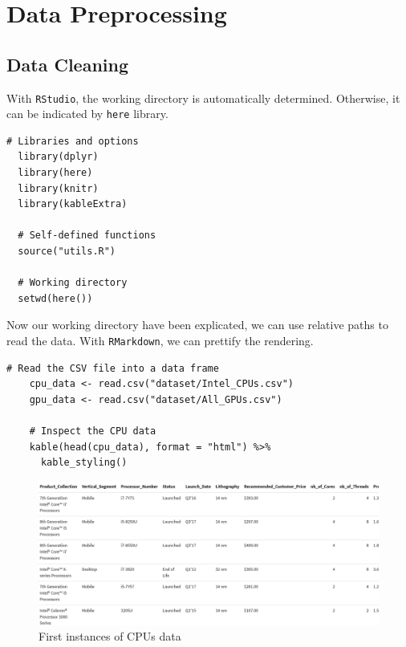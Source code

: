\chapter{Data Preprocessing}

\section{Data Cleaning}

With \texttt{RStudio}, the working directory is automatically determined. Otherwise, it can be indicated by \texttt{here} library.

\begin{lstlisting}[caption={Required libraries and working directory setup}]
  # Libraries and options
  library(dplyr)
  library(here)
  library(knitr)
  library(kableExtra)
  
  # Self-defined functions
  source("utils.R")
  
  # Working directory
  setwd(here())
  \end{lstlisting}

Now our working directory have been explicated, we can use relative paths to read the data. With \texttt{RMarkdown}, we can prettify the rendering.

\begin{lstlisting}[caption={RStudio data object initialization}]
    # Read the CSV file into a data frame
    cpu_data <- read.csv("dataset/Intel_CPUs.csv")
    gpu_data <- read.csv("dataset/All_GPUs.csv")
    
    # Inspect the CPU data
    kable(head(cpu_data), format = "html") %>%
      kable_styling()
    \end{lstlisting}

\begin{figure}[!ht]
  \centering
  \includegraphics[width=\textwidth]{img/cpu-head.png}
  \vspace{0.5cm}
  \caption{First instances of CPUs data}
\end{figure}

